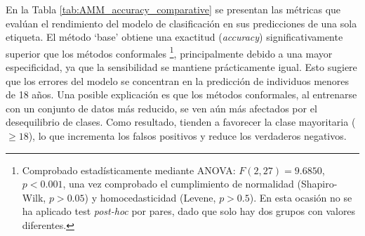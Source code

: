 En la Tabla \ref{tab:AMM_accuracy_comparative} se presentan las métricas que evalúan el rendimiento del modelo de clasificación en sus predicciones de una sola etiqueta.
El método `base' obtiene una exactitud (\textit{accuracy}) significativamente superior que los métodos conformales%
\footnote{
    Comprobado estadísticamente mediante ANOVA: $F(2, 27) = 9.6850$, $p < 0.001$, una vez comprobado el cumplimiento de normalidad (Shapiro-Wilk, $p>0.05$) y homocedasticidad (Levene, $p>0.5$). En esta ocasión no se ha aplicado test \textit{post-hoc} por pares, dado que solo hay dos grupos con valores diferentes. 
}, 
principalmente debido a una mayor especificidad, ya que la sensibilidad se mantiene prácticamente igual. Esto sugiere que los errores del modelo se concentran en la predicción de individuos menores de 18 años. Una posible explicación es que los métodos conformales, al entrenarse con un conjunto de datos más reducido, se ven aún más afectados por el desequilibrio de clases. Como resultado, tienden a favorecer la clase mayoritaria ($\ge 18$), lo que incrementa los falsos positivos y reduce los verdaderos negativos.

